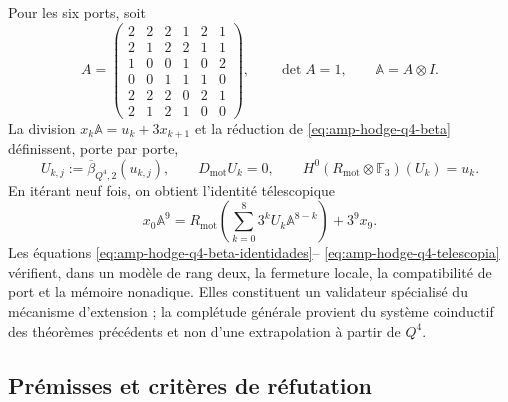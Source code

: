 Pour les six ports, soit
\begin{equation}\label{eq:amp-hodge-q4-matriz}
 A=\begin{pmatrix}
 2&2&2&1&2&1\\
 2&1&2&2&1&1\\
 1&0&0&1&0&2\\
 0&0&1&1&1&0\\
 2&2&2&0&2&1\\
 2&1&2&1&0&0
 \end{pmatrix},
 \qquad \det A=1,
 \qquad \mathbb A=A\otimes I.
\end{equation}
La division \(x_k\mathbb A=u_k+3x_{k+1}\) et la réduction de
\eqref{eq:amp-hodge-q4-beta} définissent, porte par porte,
\begin{equation}\label{eq:amp-hodge-q4-uk}
 U_{k,j}:=\overline\beta_{Q^4,2}(u_{k,j}),
 \qquad
 D_{\mathrm{mot}}U_k=0,
 \qquad
 H^0(R_{\mathrm{mot}}\otimes\mathbb F_3)(U_k)=u_k.
\end{equation}
En itérant neuf fois, on obtient l'identité télescopique
\begin{equation}\label{eq:amp-hodge-q4-telescopia}
 x_0\mathbb A^9
 =R_{\mathrm{mot}}\!\left(
   \sum_{k=0}^{8}3^kU_k\mathbb A^{8-k}\right)+3^9x_9.
\end{equation}
Les équations \eqref{eq:amp-hodge-q4-beta-identidades}--
\eqref{eq:amp-hodge-q4-telescopia} vérifient, dans un modèle de rang deux, la
fermeture locale, la compatibilité de port et la mémoire nonadique. Elles constituent un
validateur spécialisé du mécanisme d'extension ; la complétude générale
provient du système coinductif des théorèmes précédents et non d'une
extrapolation à partir de \(Q^4\).

\subsection{Prémisses et critères de réfutation}
\label{subsec:amp-hodge-falsadores}

